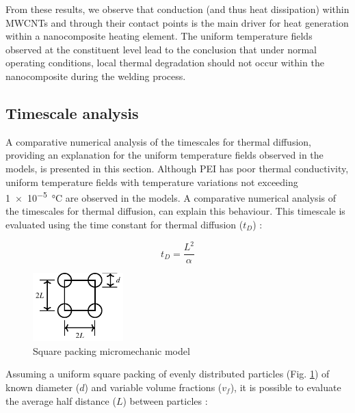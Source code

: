 \documentclass[11pt,review,times]{article}
\begin{document}
From these results, we observe that conduction (and thus heat dissipation) within MWCNTs and through their contact points is the main driver for heat generation within a nanocomposite heating element. 
The uniform temperature fields observed at the constituent level lead to the conclusion that under normal operating conditions, local thermal degradation should not occur within the nanocomposite during the welding process. 

\FloatBarrier
\subsection{Timescale analysis}
\label{sec:timeconstant}

A comparative numerical analysis of the timescales for thermal diffusion, providing an explanation for the uniform temperature fields observed in the models, is presented in this section. 
Although PEI has poor thermal conductivity, uniform temperature fields with temperature variations not exceeding \SI{1e-5}{\celsius} are observed in the models. 
A comparative numerical analysis of the timescales for thermal diffusion, can explain this behaviour. 
This timescale is evaluated using the time constant for thermal diffusion ($t_D$) : 

\begin{equation}
	t_D = \frac{L^2}{\alpha}
	\label{equa:time_constant}
\end{equation}

\begin{figure}[htb]
	\center
	\captionsetup{width=35mm}
	\includegraphics[width=35mm]{arrangement_carre}
	\caption{Square packing micromechanic model \cite{Brassard2018_figshare_article1}}
	\label{fig:square_packing}
\end{figure}

Assuming a uniform square packing of evenly distributed particles (Fig. \ref{fig:square_packing}) of known diameter ($d$) and variable volume fractions ($v_f$), it is possible to evaluate the average half distance ($L$) between particles :
\end{document}
